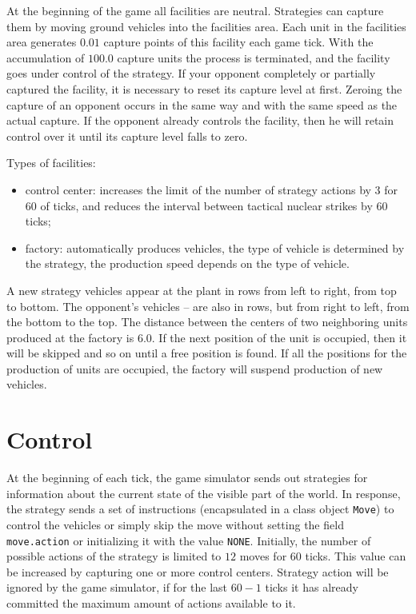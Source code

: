 At the beginning of the game all facilities are neutral. Strategies can capture them by moving ground vehicles into the facilities area.
Each unit in the facilities area generates $0.01$ capture points of this facility each game tick. With the accumulation of $100.0$ capture units
the process is terminated, and the facility goes under control of the strategy. If your opponent completely or partially captured the facility,
it is necessary to reset its capture level at first. Zeroing the capture of an opponent occurs in the same way and with the same speed as the actual
capture. If the opponent already controls the facility, then he will retain control over it until its capture level falls
to zero.

Types of facilities:
\begin{itemize}
    \item control center: increases the limit of the number of strategy actions by $3$ for $60$ of ticks, and
          reduces the interval between tactical nuclear strikes by $60$ ticks;
    \item factory: automatically produces vehicles, the type of vehicle is determined by the strategy, the production speed depends on the type of vehicle.
\end{itemize}

A new strategy vehicles appear at the plant in rows from left to right, from top to bottom. The opponent’s vehicles – are also in rows, but from right to left, from the bottom to the top. The distance between the centers of two neighboring units produced at the factory is $6.0$. If the next position of the unit is occupied,
then it will be skipped and so on until a free position is found. If all the positions for the production of units are occupied, the factory
will suspend production of new vehicles.

\section{Control}

At the beginning of each tick, the game simulator sends out strategies for information about the current state of the visible part of the world. In response, the strategy sends a set of instructions (encapsulated in a class object \texttt{Move}) to control the vehicles or simply skip the move without setting the field
\texttt{move.action} or initializing it with the value \texttt{NONE}. Initially, the number of possible actions of the strategy is limited to $12$
moves for $60$ ticks. This value can be increased by capturing one or more control centers. Strategy action
will be ignored by the game simulator, if for the last $60 - 1$ ticks it has already committed the maximum amount of actions available to it.

